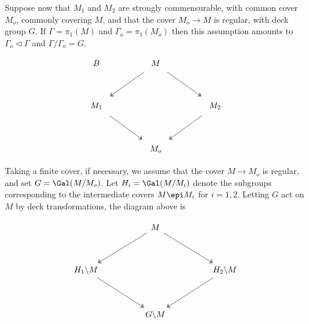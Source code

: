 \documentclass{article}
\begin{document}
Suppose now that $M_1$ and $M_2$ are strongly commensurable, with common cover $M_{o}$, commonly covering $M$, and that the cover $M_{o} \to M$ is regular, with deck group $G$. If $\Gamma = \pi_{1}(M)$ and $\Gamma_{o} = \pi_{1}(M_{o})$ then this assumption amounts to $\Gamma_{o} \triangleleft \Gamma$ and $\Gamma/\Gamma_{o} = G$. 

  


\[\begin{tikzcd}B	&& M \\
	\\
	{M_{1}} &&&& {M_{2}} \\
	\\
	&& M_{o}
	\arrow[shorten <=6pt, shorten >=6pt, two heads, from=3-1, to=5-3]
	\arrow[shorten <=6pt, shorten >=6pt, two heads, from=3-5, to=5-3]
	\arrow[shorten <=6pt, shorten >=6pt, two heads, from=1-3, to=3-1]
	\arrow[shorten <=6pt, shorten >=6pt, two heads, from=1-3, to=3-5]
\end{tikzcd}\]


Taking  a finite cover, if necessary, we assume that the cover $M \to M_{o}$ is regular, and set $G=\Gal(M/M_{o})$. Let $H_{i} = \Gal(M/M_i)$ denote the subgroups corresponding to the intermediate covers $M \epi M_i$ for $i=1,2$. Letting $G$ act on $M$ by deck transformations, the diagram above is

\[\begin{tikzcd}
	&& M \\
	\\
	{H_1 \backslash M} &&&& {H_2 \backslash M} \\
	\\
	&& {G\backslash M}
	\arrow[two heads, from=1-3, to=3-1]
	\arrow[two heads, from=1-3, to=3-5]
	\arrow[two heads, from=3-1, to=5-3]
	\arrow[two heads, from=3-5, to=5-3]
\end{tikzcd}\]
\end{document}
